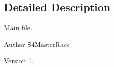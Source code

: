 \subsection{Detailed Description}
Main file. 

\begin{DoxyAuthor}{Author}
S4\+Master\+Race 
\end{DoxyAuthor}
\begin{DoxyVersion}{Version}
1. 
\end{DoxyVersion}
